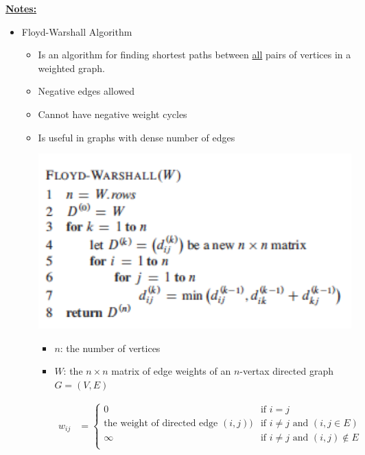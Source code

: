 \documentclass[12pt]{article}
\begin{document}
\begin{enumerate}[1.]
    \bigskip

    \underline{\textbf{Notes:}}

    \bigskip

    \begin{itemize}
        \item Floyd-Warshall Algorithm

        \begin{itemize}
            \item Is an algorithm for finding shortest paths between \underline{all} pairs of vertices in a weighted graph.
            \item Negative edges allowed
            \item Cannot have negative weight cycles
            \item Is useful in graphs with dense number of edges

            \begin{center}
            \includegraphics[width=0.5\linewidth]{images/worksheet_4_solution_46.png}
            \end{center}

            \begin{itemize}
                \item $n$: the number of vertices
                \item $W$: the $n \times n$ matrix of edge weights of an $n$-vertax directed graph $G = (V,E)$

                \begin{align}
                    w_{ij} &= \begin{cases}
                        0 & \text{if $i = j$}\\
                        \text{the weight of directed edge $(i,j)$)} & \text{if $i \neq j$ and $(i,j \in E)$}\\
                        \infty & \text{if $i \neq j$ and $(i,j) \notin E$}\\
                    \end{cases}
                \end{align}


\end{itemize}
\end{itemize}
\end{itemize}
\end{enumerate}
\end{document}

